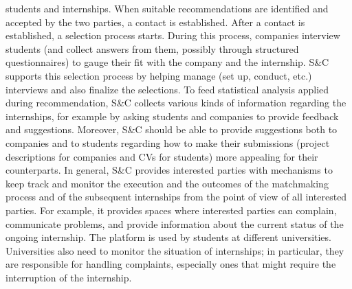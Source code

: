\documentclass [11pt,twoside]{article}
\begin{document}
students and internships.
When suitable recommendations are identified and accepted by the two parties, a contact is
established. After a contact is established, a selection process starts. During this process, companies
interview students (and collect answers from them, possibly through structured questionnaires) to
gauge their fit with the company and the internship. S\&C supports this selection process by helping
manage (set up, conduct, etc.) interviews and also finalize the selections.
To feed statistical analysis applied during recommendation, S\&C collects various kinds of information
regarding the internships, for example by asking students and companies to provide feedback and
suggestions.
Moreover, S\&C should be able to provide suggestions both to companies and to students regarding
how to make their submissions (project descriptions for companies and CVs for students) more
appealing for their counterparts.
In general, S\&C provides interested parties with mechanisms to keep track and monitor the execution
and the outcomes of the matchmaking process and of the subsequent internships from the point of
view of all interested parties. For example, it provides spaces where interested parties can complain,
communicate problems, and provide information about the current status of the ongoing internship.
The platform is used by students at different universities. Universities also need to monitor the situation
of internships; in particular, they are responsible for handling complaints, especially ones that might
require the interruption of the internship.
    
\end{document}
